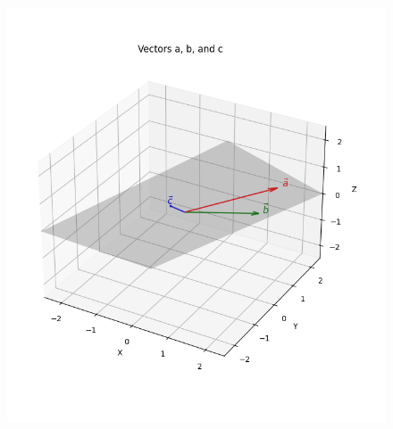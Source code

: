\documentclass[journal]{IEEEtran}
\begin{document}
\begin{figure}[ht!]
\centering
\includegraphics[height=0.6\textheight, keepaspectratio]{figs/q5.png}
\end{figure}
\end{document}
